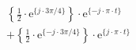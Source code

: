\correct
\[
\begin{split}
&  \left \{ \frac{1}{2} \cdot \textrm{e}^{\{  j \cdot 3\pi/4 \}} \right \} \cdot \textrm{e}^{\{- j \cdot \pi \cdot t \}}\\
&+ \left \{ \frac{1}{2} \cdot \textrm{e}^{\{ -j \cdot 3\pi/4 \}} \right \} \cdot \textrm{e}^{\{  j \cdot \pi \cdot t \}}
\end{split}
\]

